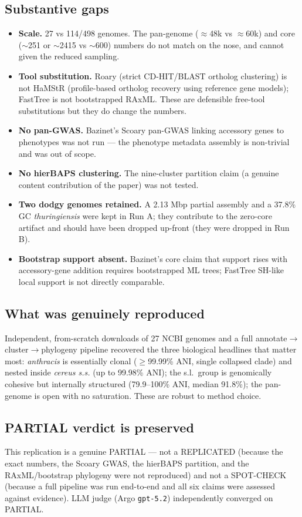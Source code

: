 \documentclass[11pt]{article}
\begin{document}
\subsection{Substantive gaps}
\begin{itemize}
    \item \textbf{Scale.} 27 vs 114/498 genomes. The pan-genome ($\approx$48k vs $\approx$60k) and core ($\sim$251 or $\sim$2415 vs $\sim$600) numbers do not match on the nose, and cannot given the reduced sampling.
    \item \textbf{Tool substitution.} Roary (strict CD-HIT/BLAST ortholog clustering) is not HaMStR (profile-based ortholog recovery using reference gene models); FastTree is not bootstrapped RAxML. These are defensible free-tool substitutions but they do change the numbers.
    \item \textbf{No pan-GWAS.} Bazinet's Scoary pan-GWAS linking accessory genes to phenotypes was not run --- the phenotype metadata assembly is non-trivial and was out of scope.
    \item \textbf{No hierBAPS clustering.} The nine-cluster partition claim (a genuine content contribution of the paper) was not tested.
    \item \textbf{Two dodgy genomes retained.} A 2.13 Mbp partial assembly and a 37.8\% GC \emph{thuringiensis} were kept in Run A; they contribute to the zero-core artifact and should have been dropped up-front (they were dropped in Run B).
    \item \textbf{Bootstrap support absent.} Bazinet's core claim that support rises with accessory-gene addition requires bootstrapped ML trees; FastTree SH-like local support is not directly comparable.
\end{itemize}

\subsection{What was genuinely reproduced}
Independent, from-scratch downloads of 27 NCBI genomes and a full annotate$\to$cluster$\to$phylogeny pipeline recovered the three biological headlines that matter most: \emph{anthracis} is essentially clonal ($\ge$99.99\% ANI, single collapsed clade) and nested inside \emph{cereus s.s.} (up to 99.98\% ANI); the s.l.\ group is genomically cohesive but internally structured (79.9--100\% ANI, median 91.8\%); the pan-genome is open with no saturation. These are robust to method choice.

\subsection{PARTIAL verdict is preserved}
This replication is a genuine PARTIAL --- not a REPLICATED (because the exact numbers, the Scoary GWAS, the hierBAPS partition, and the RAxML/bootstrap phylogeny were not reproduced) and not a SPOT-CHECK (because a full pipeline was run end-to-end and all six claims were assessed against evidence). LLM judge (Argo \texttt{gpt-5.2}) independently converged on PARTIAL.
\end{document}
